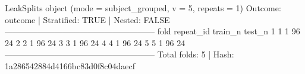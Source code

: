 \begin{CodeOutput}
LeakSplits object (mode = subject_grouped, v = 5, repeats = 1)
Outcome: outcome | Stratified: TRUE | Nested: FALSE
------------------------------------------------------
  fold repeat_id train_n test_n
1    1         1      96     24
2    2         1      96     24
3    3         1      96     24
4    4         1      96     24
5    5         1      96     24
------------------------------------------------------
Total folds: 5 | Hash: 1a286542884d4166bc83d0f8c04daecf
\end{CodeOutput}
